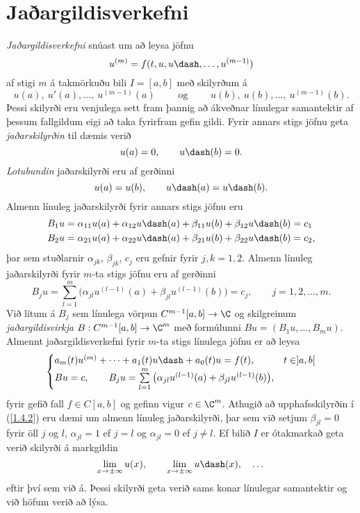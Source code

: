 \section{Jaðargildisverkefni}


\noindent
{\it Jaðargildisverkefni}  snúast um að leysa jöfnu
$$u^{(m)}=f(t,u,u\dash,\dots,u^{(m-1)})$$  
af stigi $m$ á takmörkuðu bili
$I=[a,b]$ með skilyrðum á 
$$
u(a), \ u'(a),\dots,  \ u^{(m-1)}(a)\qquad \text{ og } 
\qquad  u(b), \ u(b),\dots, \ u^{(m-1)}(b).
$$  
Þessi skilyrði eru venjulega sett fram þannig að ákveðnar línulegar
samantektir af þessum fallgildum eigi að taka fyrirfram gefin gildi.
Fyrir annars stigs jöfnu geta {\it
jaðarskilyrðin} til dæmis verið
$$
u(a)=0, \qquad u\dash(b)=0.
$$
{\it Lotubundin} jaðarskilyrði eru af gerðinni
$$
u(a)=u(b), \qquad u\dash(a)=u\dash(b).
$$
Almenn línuleg jaðarskilyrði fyrir annars stigs jöfnu eru 
\begin{align*}
B_1u&={\alpha}_{11}u(a)+{\alpha}_{12}u\dash(a)
    +{\beta}_{11}u(b)+{\beta}_{12}u\dash(b)=c_1\\
B_2u&={\alpha}_{21}u(a)+{\alpha}_{22}u\dash(a)
    +{\beta}_{21}u(b)+{\beta}_{22}u\dash(b)=c_2,
\end{align*}
þar sem stuðlarnir ${\alpha}_{jk}$, ${\beta}_{jk}$, $c_{j}$ eru gefnir
fyrir $j,k=1,2$.  Almenn línuleg jaðarskilyrði fyrir $m$-ta stigs  jöfnu
eru af gerðinni
$$
B_ju=\sum\limits_{l=1}^m \big({\alpha}_{jl}u^{(l-1)}(a)
+{\beta}_{jl}u^{(l-1)}(b)\big)=c_j, \qquad j=1,2,\dots,m.
$$
Við lítum á $B_j$ sem línulega vörpun $C^{m-1}[a,b]\to \C$ 
og skilgreinum {\it
jaðargildisvirkja}  
$B:C^{m-1}[a,b]\to \C^m$ með formúlunni
$Bu=(B_1u,\dots,B_mu)$.  Almennt jaðargildisverkefni fyrir $m$-ta stigs
línulega jöfnu er að leysa
\begin{equation*}
\begin{cases}
a_m(t)u^{(m)}+\cdots+a_1(t)u\dash+a_0(t)u=f(t),  &t\in ]a,b[\\
Bu=c, \qquad B_ju=\sum\limits_{l=1}^m \big({\alpha}_{jl}u^{(l-1)}(a)
+{\beta}_{jl}u^{(l-1)}(b)\big), 
\end{cases} \label{1.5.1}
\end{equation*} 
fyrir gefið fall $f\in C[a,b]$ og gefinn vigur $c\in \C^m$.  Athugið að
upphafsskilyrðin í (\ref{1.4.2}) eru dæmi um almenn línuleg 
jaðarskilyrði, þar
sem við setjum ${\beta}_{jl}=0$ fyrir öll $j$ og $l$, ${\alpha}_{jl}=1$
ef $j=l$ og ${\alpha}_{jl}=0$ ef $j\neq l$. 
Ef bilið $I$
er ótakmarkað geta verið skilyrði á markgildin 
$$
\lim_{x\to\pm\infty}u(x), \qquad 
\lim_{x\to \pm\infty}u\dash(x),\quad \dots 
$$
eftir því sem við á.  Þessi skilyrði geta verið sams konar línulegar 
samantektir og við höfum verið að lýsa.




